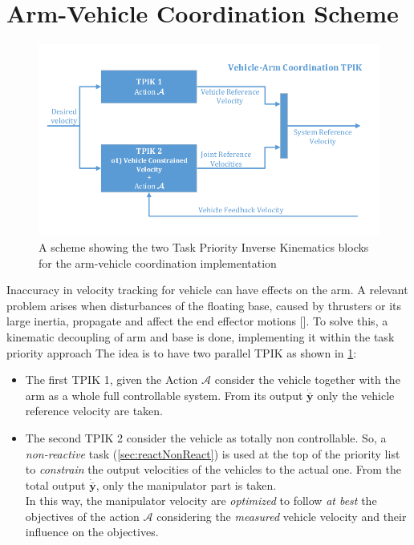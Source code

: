 \section{Arm-Vehicle Coordination Scheme}
\label{sec:armVehScheme}
\begin{figure}[H]
	\begin{center}
		\includegraphics[width=0.90\columnwidth]{vehArmCoordScheme}
		\caption[Arm-Vehicle Coordination Scheme in the TPIK]{A scheme showing the two Task Priority Inverse Kinematics blocks for the arm-vehicle coordination implementation}\label{fig:veharmcoord}
	\end{center}
\end{figure}
Inaccuracy in velocity tracking for vehicle can have effects on the arm. 
A relevant problem arises when disturbances of the floating base, caused by thrusters or its large inertia, propagate and affect the end effector motions [\cite{IntroMaris2}].
To solve this, a kinematic decoupling of arm and base is done, implementing it within the task priority approach The idea is to have two parallel TPIK as shown in \ref{fig:veharmcoord}:
\begin{itemize}
	\item The first TPIK 1, given the Action $\mathcal{A}$ consider the vehicle together with the arm as a whole full controllable system. From its output $\boldsymbol{\dot{\bar{y}}}$ only the vehicle reference velocity are taken.
	\item The second TPIK 2 consider the vehicle as totally non controllable. So, a \textit{non-reactive} task (\ref{sec:reactNonReact})  is used at the top of the priority list to \textit{constrain} the output velocities of the vehicles to the actual one. From the total output $\boldsymbol{\dot{\bar{y}}}$, only the manipulator part is taken.\\
	In this way, the manipulator velocity are \textit{optimized} to follow \textit{at best} the objectives of the action $\mathcal{A}$ considering the \textit{measured} vehicle velocity and their influence on the objectives.	
\end{itemize}

